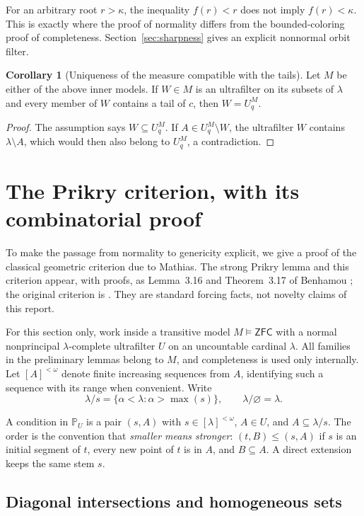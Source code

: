 \documentclass[11pt,letterpaper]{article}
\theoremstyle{definition}
\newtheorem{corollary}[definition]{Corollary}
\numberwithin{equation}{section}
\newcommand{\ZFC}{\mathsf{ZFC}}
\begin{document}
For an arbitrary root $r>\kappa$, the inequality $f(r)<r$ does not imply $f(r)<\kappa$. This is exactly where the proof of normality differs from the bounded-coloring proof of completeness. Section~\ref{sec:sharpness} gives an explicit nonnormal orbit filter.

\begin{corollary}[Uniqueness of the measure compatible with the tails]\label{cor:unique}
Let $M$ be either of the above inner models. If $W\in M$ is an ultrafilter on its subsets of $\lambda$ and every member of $W$ contains a tail of $c$, then $W=U_q^M$.
\end{corollary}

\begin{proof}
The assumption says $W\subseteq U_q^M$. If $A\in U_q^M\setminus W$, the ultrafilter $W$ contains $\lambda\setminus A$, which would then also belong to $U_q^M$, a contradiction.
\end{proof}

\section{The Prikry criterion, with its combinatorial proof}\label{sec:prikry}

To make the passage from normality to genericity explicit, we give a proof of the classical geometric criterion due to Mathias. The strong Prikry lemma and this criterion appear, with proofs, as Lemma~3.16 and Theorem~3.17 of Benhamou \cite{benhamou}; the original criterion is \cite{mathias}. They are standard forcing facts, not novelty claims of this report.

For this section only, work inside a transitive model $M\models\ZFC$ with a normal nonprincipal $\lambda$-complete ultrafilter $U$ on an uncountable cardinal $\lambda$. All families in the preliminary lemmas belong to $M$, and completeness is used only internally. Let $[A]^{<\omega}$ denote finite increasing sequences from $A$, identifying such a sequence with its range when convenient. Write
\[
 \lambda/s=\{\alpha<\lambda:\alpha>\max(s)\},\qquad \lambda/\varnothing=\lambda.
\]

A condition in $\mathbb P_U$ is a pair $(s,A)$ with $s\in[\lambda]^{<\omega}$, $A\in U$, and $A\subseteq\lambda/s$. The order is the convention that \emph{smaller means stronger}: $(t,B)\le(s,A)$ if $s$ is an initial segment of $t$, every new point of $t$ is in $A$, and $B\subseteq A$. A direct extension keeps the same stem $s$.

\subsection{Diagonal intersections and homogeneous sets}
\end{document}
